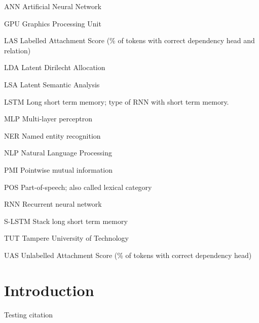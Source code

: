 \documentclass[12pt,a4paper,english
]{tutthesis}
\begin{document}
\begin{termlist}
\item[ANN] Artificial Neural Network
\item[GPU] Graphics Processing Unit
\item[LAS] Labelled Attachment Score (\% of tokens with correct dependency head and relation)
\item[LDA] Latent Dirilecht Allocation
\item[LSA] Latent Semantic Analysis
\item[LSTM] Long short term memory; type of RNN with short term memory.
\item[MLP] Multi-layer perceptron
\item[NER] Named entity recognition
\item[NLP] Natural Language Processing
\item[PMI] Pointwise mutual information
\item[POS] Part-of-speech; also called lexical category
\item[RNN] Recurrent neural network
\item[S-LSTM] Stack long short term memory
\item[TUT] Tampere University of Technology
\item[UAS] Unlabelled Attachment Score (\% of tokens with correct dependency head)
\end{termlist}



\newpage

\if@twoside
\cleardoublepage
\fi

\setcounter{page}{1} %
\renewcommand{\chaptername}{} %


\chapter{Introduction}
\label{ch:intro}
Testing citation \cite{Andor2016}
\end{document}
